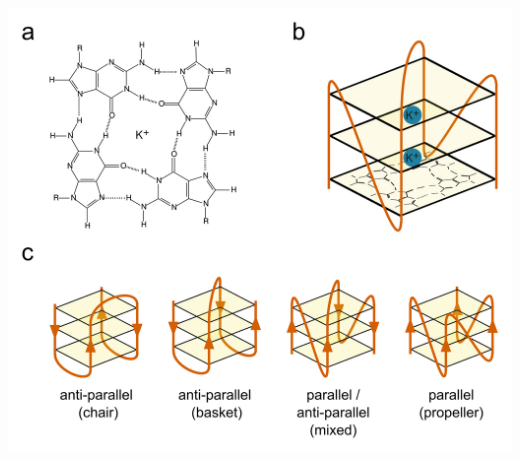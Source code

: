 \documentclass[12pt,a4paper,]{report}
\let\origfigure=\figure
\let\endorigfigure=\endfigure
\renewenvironment{figure}[1][2] {
    \expandafter\origfigure\expandafter[H]
} {
    \endorigfigure
}
\begin{document}
\newpage

\begin{figure}[htbp]
\centering
\includegraphics[width=\textwidth,height=562pt,keepaspectratio]{introduction/figures/g4_structure.png}
\caption[Structure of a G-Quadruplex]{\textbf{Structure   of   a   G-Quadruplex}   \textbf{a)}   The   molecular   structure   of   a   G-quartet.   Four   Guanosines   (only   guanine   base   is   shown,   sugar-phosphate   is   represented   as   R)   interact   through   Hoogsteen   base   pairing   around   a   central   monovalent   cation.   \textbf{b)}   Cartoon   showing   the   basic   structure   of   a   three   tetrad   G4.   Three   G-quartets   are   stacked   through   interactions   between   delocalised   pi   electrons.   The   structure   is   made   up   of   four   pillars   of   homopolymeric   G-runs   (shown   in   orange)   joined   by   loop   sequences.   Potassium   cations   (shown   in   blue)   sit   between   each   tetrad.   \textbf{c)}   Cartoons   showing   how   loop   arrangement   can   contribute   to   the   structural   polymorphism   of   G4s.   Loops   can   be   lateral,   diagonal   or   propeller   like,   resulting   in   anti-parallel,   anti-parallel,   and   parallel   G4s   respectively.   Anti-parallel   G4s   with   all   lateral   loops   are   referred   to   as   " chair -like,   whilst   anti-parallel   G4s   with   a   diagonal   loop   are   referred   to   as   basket   like.   G4s   can   also   contain   a   mix   of   parallel   and   anti-parallel   strands.   \label{g4_struct}}

\end{figure}
\end{document}

